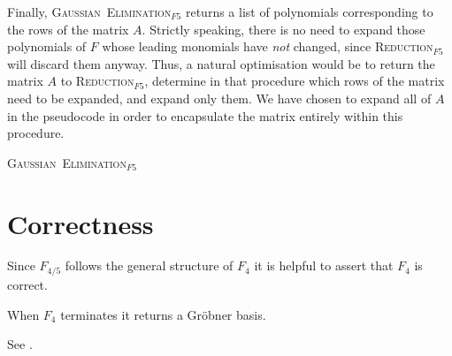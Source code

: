Finally, \textsc{Gaussian\ Elimination}$_{F5}$ returns a list of polynomials corresponding to the rows of the matrix $A$. Strictly speaking, there is no need to expand those polynomials of $F$ whose leading monomials have \emph{not} changed, since \textsc{Reduction}$_{F5}$ will discard them anyway. Thus, a natural optimisation would be to return the matrix $A$ to \textsc{Reduction}$_{F5}$, determine in that procedure which rows of the matrix need to be expanded, and expand only them. We have chosen to expand all of $A$ in the pseudocode in order to encapsulate the matrix entirely within this procedure.

\begin{algorithm}
\caption{\textsc{Gaussian\ Elimination}$_{F5}$}
\label{alg:gaussian_elimination}
\end{algorithm}

\section{Correctness}

Since $F_{4/5}$ follows the general structure of $F_4$ it is helpful to assert that $F_4$ is correct.

\begin{lemma}
\label{lem:f4_correct}
When $F_4$ terminates it returns a Gröbner basis.
\end{lemma}

\begin{citeproof}
See \cite{f4}. 
\end{citeproof}


